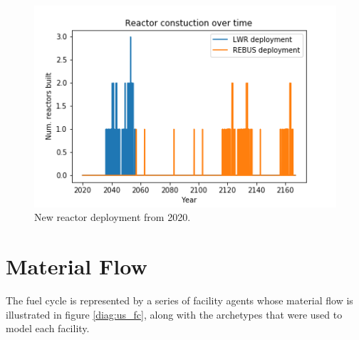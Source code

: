 \begin{figure}[htbp!]
	\begin{center}
		\includegraphics[scale=0.7]{./images/us/us_dep.png}
	\end{center}
	\caption{New reactor deployment from 2020.}
	\label{fig:us_dep}
\end{figure}

\section{Material Flow}

The fuel cycle is represented by a series of facility agents whose material 
flow is illustrated in figure \ref{diag:us_fc}, along with
the \Cyclus archetypes that were used to model each facility.

